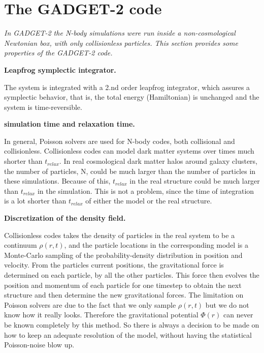 \section{The GADGET-2 code}
\textit{In GADGET-2 the N-body simulations were run inside a non-cosmological Newtonian box, with only collisionless particles. This section provides some properties of the GADGET-2 code.} \\  

\centerline{\textbf{Leapfrog symplectic integrator.}} 
The system is integrated with a 2.nd order leapfrog integrator, which assures a symplectic behavior, that is, the total energy (Hamiltonian) is unchanged and the system is time-reversible. \\

\centerline{\textbf{simulation time and relaxation time.}} 
In general, Poisson solvers are used for N-body codes, both collisional and collisionless. Collisionless codes can model dark matter systems over times much shorter than $t_{relax}$. In real cosmological dark matter halos around galaxy clusters, the number of particles, N, could be much larger than the number of particles in these simulations. Because of this, $t_{relax}$ in the real structure could be much larger than $t_{relax}$ in the simulation. This is not a problem, since the time of integration is a lot shorter than $t_{relax}$ of either the model or the real structure. \\ 

\centerline{\textbf{Discretization of the density field.}} 
Collisionless codes takes the density of particles in the real system to be a continuum $\rho(r,t)$, and the particle locations in the corresponding model is a Monte-Carlo sampling of the probability-density distribution in position and velocity. From the particles current positions, the gravitational force is determined on each particle, by all the other particles. This force then evolves the position and momentum of each particle for one timestep to obtain the next structure and then determine the new gravitational forces. The limitation on Poisson solvers are due to the fact that we only sample $\rho(r,t)$ but we do not know how it really looks. Therefore the gravitational potential $\Phi(r)$ can never be known completely by this method. So there is always a decision to be made on how to keep an adequate resolution of the model, without having the statistical Poisson-noise blow up. \\ 

